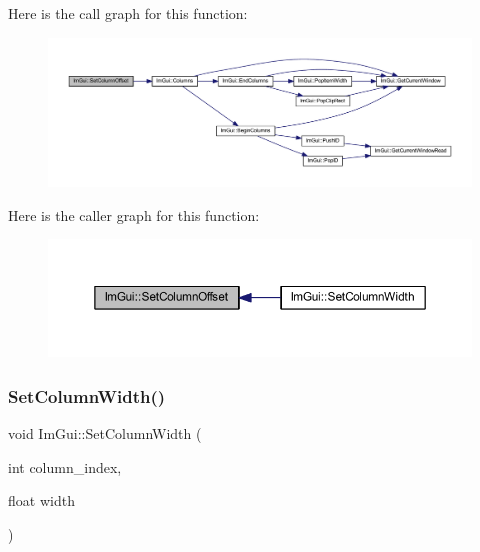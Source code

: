 Here is the call graph for this function\+:
\nopagebreak
\begin{figure}[H]
\begin{center}
\leavevmode
\includegraphics[width=350pt]{namespace_im_gui_a8cc207211d6cf3f77b505e24aed4ebcc_cgraph}
\end{center}
\end{figure}
Here is the caller graph for this function\+:
\nopagebreak
\begin{figure}[H]
\begin{center}
\leavevmode
\includegraphics[width=350pt]{namespace_im_gui_a8cc207211d6cf3f77b505e24aed4ebcc_icgraph}
\end{center}
\end{figure}
\mbox{\label{namespace_im_gui_af17222ec47aebb5ede00be7b52de9f5d}} 
\subsubsection{\texorpdfstring{Set\+Column\+Width()}{SetColumnWidth()}}
{\footnotesize\ttfamily void Im\+Gui\+::\+Set\+Column\+Width (\begin{DoxyParamCaption}\item[{int}]{column\+\_\+index,  }\item[{float}]{width }\end{DoxyParamCaption})}

